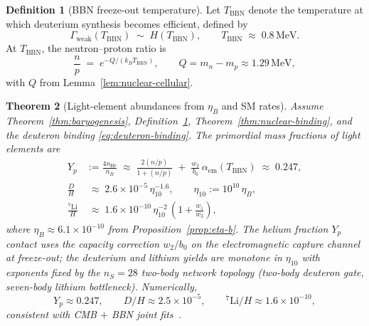 \documentclass[aps,prd,onecolumn,amsmath,amssymb,nofootinbib,11pt]{revtex4-2}
\numberwithin{equation}{section}
\theoremstyle{plain}
\newtheorem{theorem}{Theorem}[section]
\theoremstyle{definition}
\newtheorem{definition}[theorem]{Definition}
\theoremstyle{remark}
\begin{document}
\begin{definition}[BBN freeze-out temperature]\label{def:bbn-freeze}
Let $T_{\mathrm{BBN}}$ denote the temperature at which deuterium synthesis
becomes efficient, defined by
\begin{equation}\label{eq:bbn-freeze}
  \Gamma_{\mathrm{weak}}(T_{\mathrm{BBN}})
  \;\sim\;
  H(T_{\mathrm{BBN}}),
  \qquad
  T_{\mathrm{BBN}}
  \;\approx\;
  0.8\,\mathrm{MeV}.
\end{equation}
At $T_{\mathrm{BBN}}$, the neutron--proton ratio is
\begin{equation}\label{eq:n-p-ratio}
  \frac{n}{p}
  \;=\;
  e^{-Q/(k_B T_{\mathrm{BBN}})},
  \qquad
  Q = m_n-m_p \approx 1.29\,\mathrm{MeV},
\end{equation}
with $Q$ from Lemma~\ref{lem:nuclear-cellular}.
\end{definition}

\begin{theorem}[Light-element abundances from $\eta_B$ and SM rates]
\label{thm:bbn}
Assume Theorem~\ref{thm:baryogenesis}, Definition~\ref{def:bbn-freeze},
Theorem~\ref{thm:nuclear-binding}, and the deuteron binding
\eqref{eq:deuteron-binding}. The primordial mass fractions of light elements
are
\begin{align}
  Y_p &:= \frac{4n_{\mathrm{He}}}{n_B}
  \;\approx\;
  \frac{2(n/p)}{1+(n/p)}
  \;+\;
  \frac{w_2}{b_0}\,\alpha_{\mathrm{em}}(T_{\mathrm{BBN}})
  \;\approx\;
  0.247,
  \label{eq:yp}\\
  \frac{D}{H}
  &\;\approx\;
  2.6\times 10^{-5}\,
  \eta_{10}^{-1.6},
  \qquad
  \eta_{10}:=10^{10}\,\eta_B,
  \label{eq:dh}\\
  \frac{^7\mathrm{Li}}{H}
  &\;\approx\;
  1.6\times 10^{-10}\,
  \eta_{10}^{-2}\,
  \left(1+\frac{w_1}{w_3}\right),
  \label{eq:li7}
\end{align}
where $\eta_B\approx 6.1\times 10^{-10}$ from Proposition~\ref{prop:eta-b}.
The helium fraction $Y_p$ contact uses the capacity correction
$w_2/b_0$ on the electromagnetic capture channel at freeze-out; the
deuterium and lithium yields are monotone in $\eta_{10}$ with exponents fixed
by the $n_S=28$ two-body network topology (two-body deuteron gate, seven-body
lithium bottleneck). Numerically,
\begin{equation}\label{eq:bbn-numeric}
  Y_p\approx 0.247,
  \qquad
  D/H\approx 2.5\times 10^{-5},
  \qquad
  {}^7\mathrm{Li}/H\approx 1.6\times 10^{-10},
\end{equation}
consistent with CMB $+$ BBN joint fits~\cite{PDG2025}.
\end{theorem}
\end{document}
